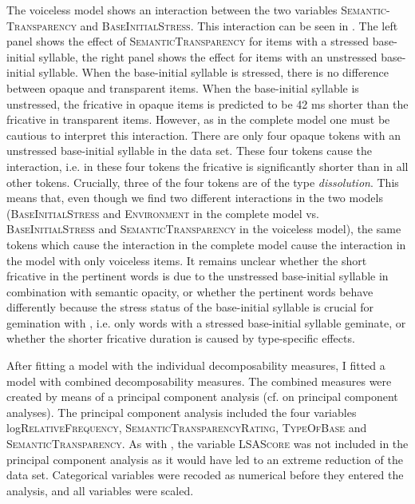 The voiceless model shows an interaction between the two variables \textsc{Semantic-Transparency} and \textsc{BaseInitialStress}. This interaction can be seen in . The left panel shows the effect of \textsc{SemanticTransparency} for items with a stressed base-initial syllable, the right panel shows the effect for items with an unstressed base-initial syllable. When the base-initial syllable is stressed, there is no difference between opaque and transparent items. When the base-initial syllable is unstressed, the fricative in opaque items is predicted to be 42 ms shorter than the fricative in transparent items. However, as in the complete model one must be cautious to  interpret this interaction. There are only four opaque tokens with an unstressed base-initial syllable in the data set. These four tokens cause the interaction, i.e. in these four tokens the fricative is significantly shorter than in all other tokens. 
Crucially, three of the four tokens are of the type \textit{dissolution}. This means that, even though we find two different interactions in the two models (\textsc{BaseInitialStress} and \textsc{Environment} in the complete model vs. \textsc{BaseInitialStress} and \textsc{SemanticTransparency} in the voiceless model), the same tokens which cause the interaction in the complete model cause the interaction in the model with only voiceless items. It remains unclear whether the short fricative in the pertinent words is due to the unstressed base-initial syllable in combination with semantic opacity, or whether the pertinent words behave differently because the stress status of the base-initial syllable is crucial for gemination with , i.e. only words with a stressed base-initial syllable geminate, or whether the shorter fricative duration is caused by type-specific effects. 



After fitting a model with the individual decomposability measures, I fitted a model with combined decomposability measures. The combined measures were created by means of a principal component analysis (cf.  on principal component analyses). 
The principal component analysis included the four variables log\textsc{RelativeFrequency}, \textsc{SemanticTransparencyRating}, \textsc{TypeOfBase} and \textsc{SemanticTransparency}. As with , the variable \textsc{LSAScore} was not included in the principal component analysis as it would have led to an extreme reduction of the data set. Categorical variables were recoded as numerical before they entered the analysis, and all variables were scaled.




